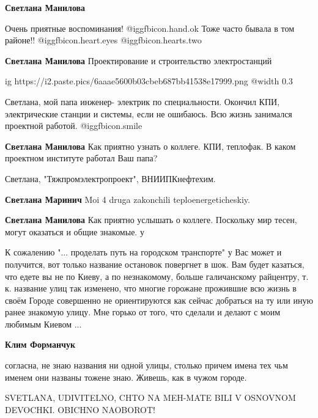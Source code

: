 \begin{itemize}
\begin{itemize}
\textbf{Светлана Манилова} 

Очень приятные воспоминания!  @igg{fbicon.hand.ok} Тоже часто бывала в том
районе!!  @igg{fbicon.heart.eyes}  @igg{fbicon.hearts.two} 

\textbf{Светлана Манилова} Проектирование и строительство электростанций

\ifcmt
  ig https://i2.paste.pics/6aaae5600b03cbeb687bb41538e17999.png
  @width 0.3
\fi


Светлана, мой папа инженер- электрик по специальности. Окончил КПИ,
электрические станции и системы, если не ошибаюсь. Всю жизнь занимался
проектной работой. @igg{fbicon.smile} 


\textbf{Светлана Манилова} Как приятно узнать о коллеге. КПИ, теплофак. В каком проектном институте работал Ваш папа?

Светлана, "Тяжпромэлектропроект", ВНИИПКнефтехим.

\textbf{Светлана Маринич} Moi 4 druga zakonchili teploenergeticheskiy.

\textbf{Светлана Манилова} Как приятно услышать о коллеге. Поскольку мир тесен, могут оказаться и общие знакомые. у

\end{itemize} %


К сожалению "... проделать путь на городском транспорте" у Вас может и
получится, вот только название остановок повергнет в шок. Вам будет казаться,
что едете вы не по Киеву, а по незнакомому, больше галичанскому райцентру, т. к.
название улиц так изменено, что многие горожане прожившие всю жизнь в своём
Городе совершенно не ориентируются как сейчас добраться на ту или иную ранее
знакомую улицу. Мне горько от того, что сделали и делают с моим любимым Киевом
...

\begin{itemize} %
\textbf{Клим Форманчук} 

согласна, не знаю названия ни одной улицы, столько причем имена тех чьм именем
они названы тожене знаю. Живешь, как в чужом городе.

\end{itemize} %


SVETLANA, UDIVITELNO, CHTO NA MEH-MATE BILI V OSNOVNOM DEVOCHKI. OBICHNO
NAOBOROT!


\end{itemize}
